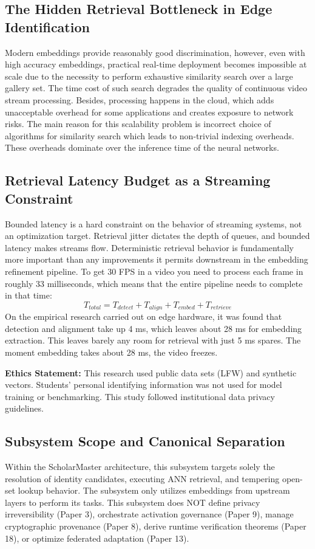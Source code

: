 \documentclass[conference]{IEEEtran}
\begin{document}
\subsection{The Hidden Retrieval Bottleneck in Edge Identification}
Modern embeddings provide reasonably good discrimination, however, even with high accuracy embeddings, practical real-time deployment becomes impossible at scale due to the necessity to perform exhaustive similarity search over a large gallery set. The time cost of such search degrades the quality of continuous video stream processing. Besides, processing happens in the cloud, which adds unacceptable overhead for some applications and creates exposure to network risks. The main reason for this scalability problem is incorrect choice of algorithms for similarity search which leads to non-trivial indexing overheads. These overheads dominate over the inference time of the neural networks.

\subsection{Retrieval Latency Budget as a Streaming Constraint}
Bounded latency is a hard constraint on the behavior of streaming systems, not an optimization target. Retrieval jitter dictates the depth of queues, and bounded latency makes streams flow. Deterministic retrieval behavior is fundamentally more important than any improvements it permits downstream in the embedding refinement pipeline. To get 30 FPS in a video you need to process each frame in roughly 33 milliseconds, which means that the entire pipeline needs to complete in that time:
\begin{equation}
T_{total} = T_{detect} + T_{align} + T_{embed} + T_{retrieve}
\end{equation}
On the empirical research carried out on edge hardware, it was found that detection and alignment take up 4 ms, which leaves about 28 ms for embedding extraction. This leaves barely any room for retrieval with just 5 ms spares. The moment embedding takes about 28 ms, the video freezes.

\textbf{Ethics Statement:} This research used public data sets (LFW) and synthetic vectors. Students’ personal identifying information was not used for model training or benchmarking. This study followed institutional data privacy guidelines.

\subsection{Subsystem Scope and Canonical Separation}
Within the ScholarMaster architecture, this subsystem targets solely the resolution of identity candidates, executing ANN retrieval, and tempering open-set lookup behavior. The subsystem only utilizes embeddings from upstream layers to perform its tasks. This subsystem does NOT define privacy irreversibility (Paper 3), orchestrate activation governance (Paper 9), manage cryptographic provenance (Paper 8), derive runtime verification theorems (Paper 18), or optimize federated adaptation (Paper 13).
\end{document}
